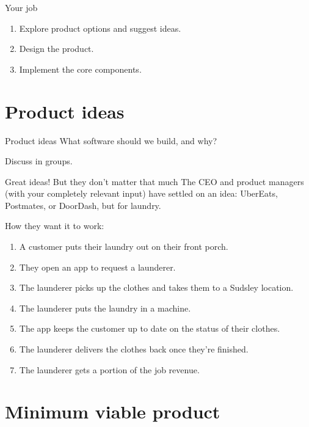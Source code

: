 \documentclass[aspectratio=169]{beamer}
\begin{document}
\begin{frame}{Your job}
  \begin{enumerate}
    \item Explore product options and suggest ideas.
    \item Design the product.
    \item Implement the core components.
  \end{enumerate}
\end{frame}

\section{Product ideas}

\begin{frame}{Product ideas}
  \Large What software should we build, and why?

  \bigskip
  \normalsize\alert{Discuss in groups.}
\end{frame}

\begin{frame}{Great ideas! But they don't matter that much}
  The CEO and product managers (with your completely relevant input) have settled on an idea:
  \alert{UberEats, Postmates, or DoorDash, but for laundry.}

  \medskip
  How they want it to work:
  \begin{enumerate}
    \small
    \item A customer puts their laundry out on their front porch.
    \item They open an app to request a launderer.
    \item The launderer picks up the clothes and takes them to a Sudsley location.
    \item The launderer puts the laundry in a machine.
    \item The app keeps the customer up to date on the status of their clothes.
    \item The launderer delivers the clothes back once they're finished.
    \item The launderer gets a portion of the job revenue.
  \end{enumerate}
\end{frame}

\section{Minimum viable product}
\end{document}
